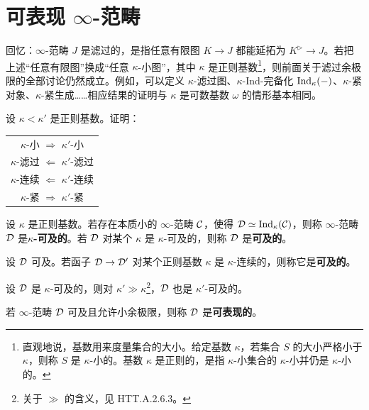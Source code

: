 \section{可表现 $\infty$-范畴}

\nitem\label{L13-3.1} 回忆：$\infty$-范畴 $J$ 是滤过的，是指任意有限图 $K\to J$ 都能延拓为 $K^{\triangleright}\to J$。若把上述“任意有限图”换成“任意 $\kappa$-小图”，其中 $\kappa$ 是正则基数\footnote{直观地说，基数用来度量集合的大小。给定基数 $\kappa$，若集合 $S$ 的大小严格小于 $\kappa$，则称 $S$ 是 $\kappa$-小的。基数 $\kappa$ 是正则的，是指 $\kappa$-小集合的 $\kappa$-小并仍是 $\kappa$-小的。}，则前面关于滤过余极限的全部讨论仍然成立。例如，可以定义 $\kappa$-滤过图、$\kappa$-Ind-完备化 $\operatorname{Ind}_\kappa(-)$、$\kappa$-紧对象、$\kappa$-紧生成……相应结果的证明与 $\kappa$ 是可数基数 $\omega$ 的情形基本相同。

\begin{exercise}\label{L13-3.2}
设 $\kappa<\kappa'$ 是正则基数。证明：
\begin{center}
\begin{tabular}{c}
$\kappa$-小 $\Rightarrow$ $\kappa'$-小\\
$\kappa$-滤过 $\Leftarrow$ $\kappa'$-滤过\\
$\kappa$-连续 $\Leftarrow$ $\kappa'$-连续\\
$\kappa$-紧 $\Rightarrow$ $\kappa'$-紧
\end{tabular}
\end{center}
\end{exercise}

\begin{definition}\label{L13-3.3}
设 $\kappa$ 是正则基数。若存在本质小的 $\infty$-范畴 $\mathcal{C}$，使得 $\mathcal{D}\simeq\operatorname{Ind}_\kappa(\mathcal{C})$，则称 $\infty$-范畴 $\mathcal{D}$ 是\textbf{$\kappa$-可及的}。若 $\mathcal{D}$ 对某个 $\kappa$ 是 $\kappa$-可及的，则称 $\mathcal{D}$ 是\textbf{可及的}。
\end{definition}

\begin{definition}\label{L13-3.4}
设 $\mathcal{D}$ 可及。若函子 $\mathcal{D}\to\mathcal{D}'$ 对某个正则基数 $\kappa$ 是 $\kappa$-连续的，则称它是\textbf{可及的}。
\end{definition}

\begin{lemma}[HTT.5.4.2.8]\label{L13-3.5}
设 $\mathcal{D}$ 是 $\kappa$-可及的，则对 $\kappa'\gg\kappa$\footnote{关于 $\gg$ 的含义，见 HTT.A.2.6.3。}，$\mathcal{D}$ 也是 $\kappa'$-可及的。
\end{lemma}

\begin{definition}\label{L13-3.6}
若 $\infty$-范畴 $\mathcal{D}$ 可及且允许小余极限，则称 $\mathcal{D}$ 是\textbf{可表现的}。
\end{definition}

